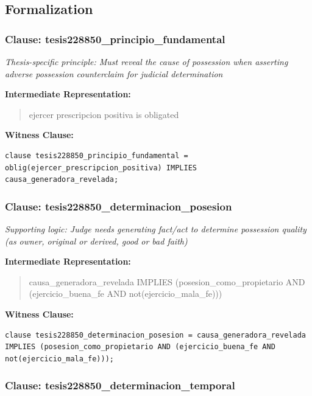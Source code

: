 \documentclass[11pt,a4paper]{article}
\begin{document}
\subsection{Formalization}

\subsubsection{Clause: tesis228850\_principio\_fundamental}

\textit{Thesis-specific principle: Must reveal the cause of possession when asserting adverse possession counterclaim for judicial determination}

\textbf{Intermediate Representation:}

\begin{quote}
ejercer prescripcion positiva is obligated
\end{quote}

\textbf{Witness Clause:}

\begin{lstlisting}[style=witnessstyle, language=Witness]
clause tesis228850_principio_fundamental = oblig(ejercer_prescripcion_positiva) IMPLIES causa_generadora_revelada;
\end{lstlisting}

\subsubsection{Clause: tesis228850\_determinacion\_posesion}

\textit{Supporting logic: Judge needs generating fact/act to determine possession quality (as owner, original or derived, good or bad faith)}

\textbf{Intermediate Representation:}

\begin{quote}
causa\_generadora\_revelada IMPLIES (posesion\_como\_propietario AND (ejercicio\_buena\_fe AND not(ejercicio\_mala\_fe)))
\end{quote}

\textbf{Witness Clause:}

\begin{lstlisting}[style=witnessstyle, language=Witness]
clause tesis228850_determinacion_posesion = causa_generadora_revelada IMPLIES (posesion_como_propietario AND (ejercicio_buena_fe AND not(ejercicio_mala_fe)));
\end{lstlisting}

\subsubsection{Clause: tesis228850\_determinacion\_temporal}
\end{document}
